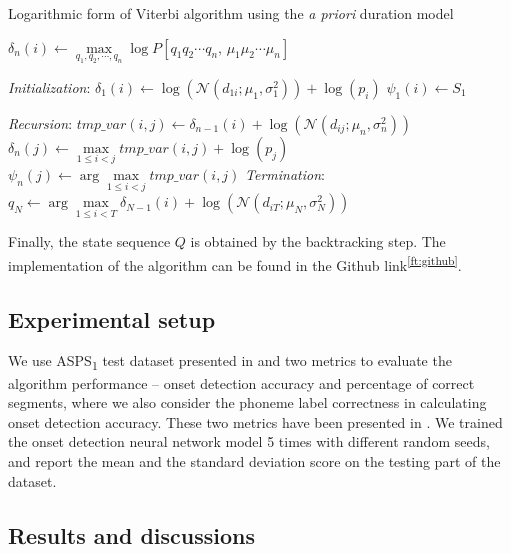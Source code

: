 \begin{algorithm}
\caption{Logarithmic form of Viterbi algorithm using the \textit{a priori} duration model}\label{alg:log_viterbi}
\begin{algorithmic}
\item $\delta_n(i) \gets \max\limits_{q_1,q_2,\cdots,q_n}{\log P[q_1 q_2 \cdots q_n,\, \mu_1 \mu_2 \cdots \mu_n]}$

\BState \emph{Initialization}:
\State $\delta_1(i) \gets \log(\mathcal{N} (d_{1i} ; \mu_1, \sigma_1^2))+\log(p_i)$
\State $\psi_1(i) \gets S_1$

\BState \emph{Recursion}:
\State $tmp\_var(i,j) \gets \delta_{n-1} (i) + \log(\mathcal{N} (d_{ij} ; \mu_n, \sigma_n^2))$
\State $\delta_n (j) \gets \max\limits_{1 \leqslant i < j} tmp\_var(i,j) +\log(p_j)$
\State $\psi_n (j) \gets \arg\max\limits_{1 \leqslant i < j} tmp\_var(i,j)$
\BState \emph{Termination}:
\State $q_{N} \gets \arg\max\limits_{1 \leqslant i < T} {\delta_{N-1} (i) + \log(\mathcal{N} (d_{i T} ; \mu_N, \sigma_N^2))}$
\EndProcedure
\end{algorithmic}
\end{algorithm}

Finally, the state sequence $Q$ is obtained by the backtracking step. The implementation of the algorithm can be found in the Github link\textsuperscript{\ref{ft:github}}.

\subsection{Experimental setup}

We use ASPS\textsubscript{1} test dataset presented in  and two metrics to evaluate the algorithm performance -- onset detection accuracy and percentage of correct segments, where we also consider the phoneme label correctness in calculating onset detection accuracy. These two metrics have been presented in . We trained the onset detection neural network model 5 times with different random seeds, and report the mean and the standard deviation score on the testing part of the dataset.

\subsection{Results and discussions}

